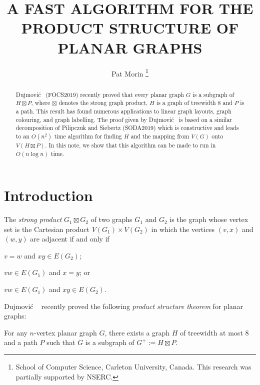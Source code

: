 \documentclass[kpfonts]{patmorin}
\title{\MakeUppercase{A Fast Algorithm for the Product Structure of Planar Graphs}}
\author{
  Pat Morin%
    \thanks{School of Computer Science, Carleton University, Canada. This research was partially supported by NSERC.}
}
\date{}
\begin{document}
\maketitle

\begin{abstract}
  Dujmović \etal\  (FOCS2019) recently proved that every planar graph $G$ is a subgraph of $H\boxtimes P$, where $\boxtimes$ denotes the strong graph product, $H$ is a graph of treewidth 8 and $P$ is a path.  This result has found numerous applications to linear graph layouts, graph colouring, and graph labelling.  The proof given by Dujmović \etal\  is based on a similar decomposition of Pilipczuk and Siebertz (SODA2019) which is constructive and leads to an $O(n^2)$ time algorithm for finding $H$ and the mapping from $V(G)$ onto $V(H\boxtimes P)$.  In this note, we show that this algorithm can be made to run in $O(n\log n)$ time.
\end{abstract}

\section{Introduction}

The \emph{strong product} $G_1\boxtimes G_2$ of two graphs $G_1$ and $G_2$ is the graph whose vertex set is the Cartesian product $V(G_1)\times V(G_2)$ in which the vertices $(v,x)$ and $(w,y)$ are adjacent if and only if
\begin{compactitem}
  \item $v=w$ and $xy\in E(G_2)$;
  \item $vw\in E(G_1)$ and $x=y$; or
  \item $vw\in E(G_1)$ and $xy\in E(G_2)$.
\end{compactitem}
Dujmović \etal\  \cite{dujmovic.joret.ea:planar} recently proved the following \emph{product structure theorem} for planar graphs:

\begin{thm}
  For any $n$-vertex planar graph $G$, there exists a graph $H$ of treewidth at most 8 and a path $P$ such that $G$ is a subgraph of $G^+:=H\boxtimes P$.
\end{thm}
\end{document}
